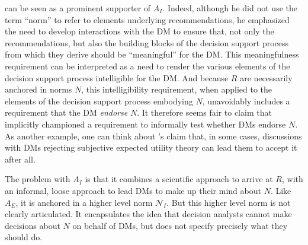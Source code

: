 \documentclass[preprint, french, english, 11pt, authoryear]{elsarticle}%
\begin{document}
\citet{roy_multicriteria_1996} can be seen as a prominent supporter of $A_I$. 
Indeed, although he did not use the term “norm” to refer to elements underlying recommendations, he emphasized the need to develop interactions with the \ac{DM} to ensure that, not only the recommendations, 
but also the building blocks of the decision support process from which they derive should be ``meaningful'' for the \ac{DM}.
This meaningfulness requirement can be interpreted as a need to render the various elements of the decision support process intelligible for the \ac{DM}.
And because $R$ are necessarily anchored in norms $N$, this intelligibility requirement, when applied to the elements of the decision support process embodying $N$, unavoidably includes a requirement that the \ac{DM} \emph{endorse} $N$. 
It therefore seems fair to claim that \citet{roy_multicriteria_1996} implicitly championed a requirement to informally test whether \acp{DM} endorse $N$. 
As another example, one can think about \citet{raiffa_back_1985}’s claim that, in some cases, discussions with \acp{DM} rejecting subjective expected utility theory can lead them to accept it after all.

The problem with $A_I$ is that it combines a scientific approach to arrive at $R$, with an informal, loose approach to lead \acp{DM} to make up their mind about $N$.
Like $A_E$, it is anchored in a higher level norm $\mathscr{N}_I$. But this higher level norm is not clearly articulated. It encapsulates the idea that decision analysts cannot make decisions about $N$ on behalf of \acp{DM}, but does not specify precisely what they should do.
\end{document}

